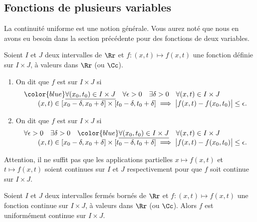 \documentclass[class=report,crop=false]{standalone}
\begin{document}


\subsection{Fonctions de plusieurs variables}

La continuité uniforme est une notion générale. Vous aurez noté que nous
en avons eu besoin dans la section précédente pour des fonctions de deux variables.

\begin{definition}
\label{def:contunif2}
Soient $I$ et $J$ deux intervalles de $\Rr$ et $f : (x,t)\longmapsto
f(x,t)$ une fonction définie sur $I\times J$,
à valeurs dans $\Rr$ (ou $\Cc$).
\begin{enumerate}
\item
On dit que $f$ est  sur $I\times J$ si
$$\begin{array}{l}
{\color{blue}\underline{\forall (x_0,t_0)\in I\times J}}\quad
\forall \epsilon>0\quad
\exists \delta>0\quad
\forall (x,t) \in I\times J \\
\qquad 
(x,t) \in [x_0-\delta,x_0+\delta]\times [t_0-\delta,t_0+\delta] 
\implies \big|f(x,t)-f(x_0,t_0)\big|\le \epsilon.
\end{array}$$

\item
On dit que $f$ est  sur $I\times J$ si
$$\begin{array}{l}
\forall \epsilon>0\quad
\exists \delta>0\quad
{\color{blue}\underline{\forall (x_0,t_0)\in I\times J}}\quad
\forall (x,t) \in I\times J \\
\qquad 
(x,t) \in [x_0-\delta,x_0+\delta]\times [t_0-\delta,t_0+\delta] 
\implies \big|f(x,t)-f(x_0,t_0)\big|\le \epsilon.
\end{array}$$
\end{enumerate}
\end{definition}



Attention, il ne suffit pas que les applications partielles 
$x \mapsto f(x,t)$ et $t \mapsto f(x,t)$ soient
continues sur $I$ et $J$ respectivement pour 
que $f$ soit continue sur $I\times J$.



\begin{theoreme}
\label{th:heine2}
Soient $I$ et $J$ deux intervalles fermés bornés de $\Rr$ et 
$f : (x,t)\longmapsto f(x,t)$ une fonction continue sur $I\times J$,
à valeurs dans $\Rr$ (ou $\Cc$). 
Alors $f$ est uniformément continue sur $I\times J$.
\end{theoreme}
\end{document}
